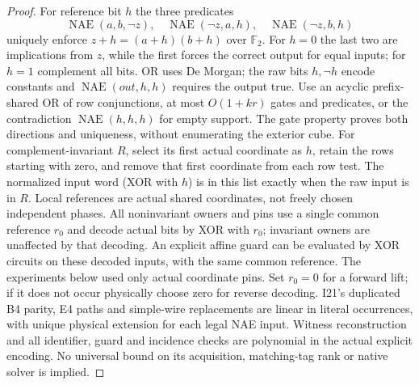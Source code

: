 \documentclass[11pt]{article}
\begin{document}
\begin{proof}
For reference bit $h$ the three predicates
\[
 \operatorname{NAE}(a,b,\neg z),\quad
 \operatorname{NAE}(\neg z,a,h),\quad
 \operatorname{NAE}(\neg z,b,h)
\]
uniquely enforce $z+h=(a+h)(b+h)$ over $\mathbb F_2$. For $h=0$ the last two are implications from $z$, while the first forces the correct output for equal inputs; for $h=1$ complement all bits. OR uses De Morgan; the raw bits $h,\neg h$ encode constants and $\operatorname{NAE}(out,h,h)$ requires the output true. Use an acyclic prefix-shared OR of row conjunctions, at most $O(1+kr)$ gates and predicates, or the contradiction $\operatorname{NAE}(h,h,h)$ for empty support. The gate property proves both directions and uniqueness, without enumerating the exterior cube. For complement-invariant $R$, select its first actual coordinate as $h$, retain the rows starting with zero, and remove that first coordinate from each row test. The normalized input word (XOR with $h$) is in this list exactly when the raw input is in $R$. Local references are actual shared coordinates, not freely chosen independent phases. All noninvariant owners and pins use a single common reference $r_0$ and decode actual bits by XOR with $r_0$; invariant owners are unaffected by that decoding. An explicit affine guard can be evaluated by XOR circuits on these decoded inputs, with the same common reference. The experiments below used only actual coordinate pins. Set $r_0=0$ for a forward lift; if it does not occur physically choose zero for reverse decoding. I21's duplicated B4 parity, E4 paths and simple-wire replacements are linear in literal occurrences, with unique physical extension for each legal NAE input. Witness reconstruction and all identifier, guard and incidence checks are polynomial in the actual explicit encoding. No universal bound on its acquisition, matching-tag rank or native solver is implied.
\end{proof}
\end{document}
